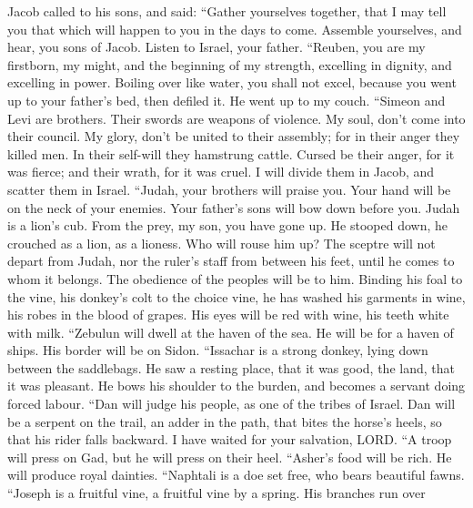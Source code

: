  Jacob called to his sons, and said: ``Gather yourselves
together, that I may tell you that which will happen to you in the days
to come.  Assemble yourselves, and hear, you sons of
Jacob. Listen to Israel, your father.  ``Reuben, you are
my firstborn, my might, and the beginning of my strength, excelling in
dignity, and excelling in power.  Boiling over like water,
you shall not excel, because you went up to your father's bed, then
defiled it. He went up to my couch.  ``Simeon and Levi are
brothers. Their swords are weapons of violence.  My soul,
don't come into their council. My glory, don't be united to their
assembly; for in their anger they killed men. In their self-will they
hamstrung cattle.  Cursed be their anger, for it was
fierce; and their wrath, for it was cruel. I will divide them in Jacob,
and scatter them in Israel.  ``Judah, your brothers will
praise you. Your hand will be on the neck of your enemies. Your father's
sons will bow down before you.  Judah is a lion's cub.
From the prey, my son, you have gone up. He stooped down, he crouched as
a lion, as a lioness. Who will rouse him up?  The sceptre
will not depart from Judah, nor the ruler's staff from between his feet,
until he comes to whom it belongs. The obedience of the peoples will be
to him.  Binding his foal to the vine, his donkey's colt
to the choice vine, he has washed his garments in wine, his robes in the
blood of grapes.  His eyes will be red with wine, his
teeth white with milk.  ``Zebulun will dwell at the haven
of the sea. He will be for a haven of ships. His border will be on
Sidon.  ``Issachar is a strong donkey, lying down between
the saddlebags.  He saw a resting place, that it was
good, the land, that it was pleasant. He bows his shoulder to the
burden, and becomes a servant doing forced labour.  ``Dan
will judge his people, as one of the tribes of Israel. 
Dan will be a serpent on the trail, an adder in the path, that bites the
horse's heels, so that his rider falls backward.  I have
waited for your salvation, LORD.  ``A troop will press on
Gad, but he will press on their heel.  ``Asher's food
will be rich. He will produce royal dainties.  ``Naphtali
is a doe set free, who bears beautiful fawns.  ``Joseph
is a fruitful vine, a fruitful vine by a spring. His branches run over
